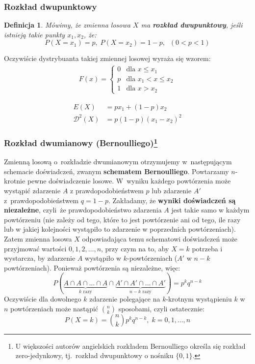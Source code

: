 \documentclass[10pt,a4paper]{article}
\newtheorem{definition}{Definicja}[section]
\numberwithin{equation}{subsection}
\begin{document}
\subsubsection{Rozkład dwupunktowy}
\begin{definition}
  Mówimy, że zmienna losowa $X$ ma \textbf{rozkład dwupunktowy}, jeśli istnieją
  takie punkty $x_1, x_2$, że:
  \begin{equation}
    P(X=x_1)=p,\;P(X=x_2)=1-p,\;\;(0<p<1)
  \end{equation}
\end{definition}

Oczywiście dystrybuanta takiej zmiennej losowej wyraża się wzorem:
\begin{eqnarray}
  F(x) = \begin{cases}
    0 & \text{dla } x \leq x_1 \\
    p & \text{dla } x_1 < x \leq x_2 \\
    1 & \text{dla } x > x_2
  \end{cases}
\end{eqnarray}

\begin{align*}
  E(X) &= px_1 + (1 - p)x_2 \\
  \mathscr{D}^2(X) &= p(1 - p)(x_1 - x_2)^2
\end{align*}

\subsubsection{Rozkład dwumianowy (Bernoulliego)\footnote{U większości autorów
  angielskich rozkładem Bernoulliego określa się rozkład zero-jedynkowy,
  tj.~rozkład dwupunktowy o nośniku $\{0,1\}$.}}
Zmienną losową o~rozkładzie dwumianowym otrzymujemy w~następującym schemacie
doświadczeń, zwanym \textbf{schematem Bernoulliego}. Powtarzamy $n$-krotnie
pewne doświadczenie losowe. W~wyniku każdego powtórzenia może wystąpić zdarzenie
$A$ z prawdopodobieństwem $p$ lub zdarzenie $A'$ z~prawdopodobieństwem $q=1-p$.
Zakładamy, że \textbf{wyniki doświadczeń są niezależne}, czyli~że
prawdopodobieństwo zdarzenia $A$ jest takie samo w każdym powtórzeniu
(nie zależy od tego, które to jest powtórzenie ani od tego, ile razy lub
w jakiej kolejności wystąpiło to zdarzenie w poprzednich powtórzeniach). Zatem
zmienna losowa $X$ odpowiadająca temu schematowi doświadczeń może przyjmować
wartości $0,1,2,\ldots,n$, przy czym na to, aby $X=k$ potrzeba i wystarcza,
by zdarzenie $A$ wystąpiło w $k$-powtórzeniach ($A'$ w $n-k$ powtórzeniach).
Ponieważ powtórzenia są niezależne, więc:
\[
  P(\underbrace{A\cap A\cap\ldots\cap A}_{k\textrm{~razy}}\cap
  \underbrace{A'\cap A'\cap\ldots\cap A'}_{n-k\textrm{~razy}}) = p^kq^{n-k}
\]
Oczywiście dla dowolnego $k$ zdarzenie polegające na $k$-krotnym wystąpieniu
$k$ w~$n$ powtórzeniach może nastąpić $n \choose k$ sposobami,
czyli ostatecznie:
\begin{equation} \label{eq:binom}
  P(X=k) = {n\choose k} p^kq^{n-k},\;k=0,1,\dotsc,n
\end{equation}
\end{document}
